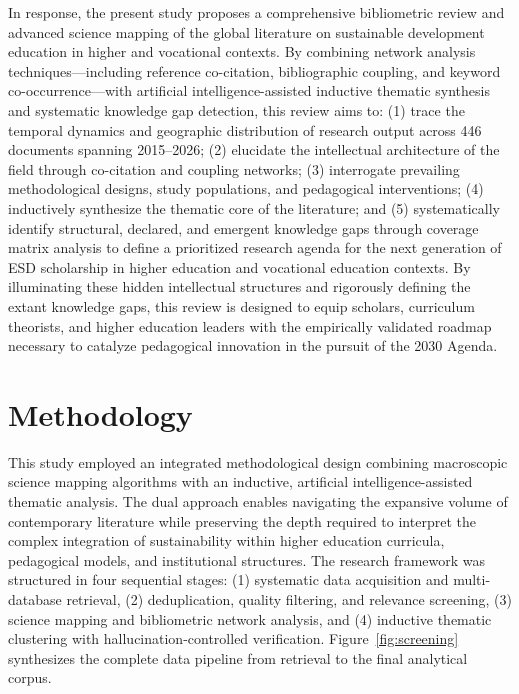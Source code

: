 \documentclass[pdflatex,sn-basic]{sn-jnl}%
\begin{document}
In response, the present study proposes a comprehensive bibliometric review and advanced science mapping of the global literature on sustainable development education in higher and vocational contexts. By combining network analysis techniques---including reference co-citation, bibliographic coupling, and keyword co-occurrence---with artificial intelligence-assisted inductive thematic synthesis and systematic knowledge gap detection, this review aims to: (1) trace the temporal dynamics and geographic distribution of research output across 446 documents spanning 2015--2026; (2) elucidate the intellectual architecture of the field through co-citation and coupling networks; (3) interrogate prevailing methodological designs, study populations, and pedagogical interventions; (4) inductively synthesize the thematic core of the literature; and (5) systematically identify structural, declared, and emergent knowledge gaps through coverage matrix analysis to define a prioritized research agenda for the next generation of ESD scholarship in higher education and vocational education contexts. By illuminating these hidden intellectual structures and rigorously defining the extant knowledge gaps, this review is designed to equip scholars, curriculum theorists, and higher education leaders with the empirically validated roadmap necessary to catalyze pedagogical innovation in the pursuit of the 2030 Agenda.


\section{Methodology}
\label{sec:metodologia}

This study employed an integrated methodological design combining macroscopic science mapping algorithms with an inductive, artificial intelligence-assisted thematic analysis. The dual approach enables navigating the expansive volume of contemporary literature while preserving the depth required to interpret the complex integration of sustainability within higher education curricula, pedagogical models, and institutional structures. The research framework was structured in four sequential stages: (1) systematic data acquisition and multi-database retrieval, (2) deduplication, quality filtering, and relevance screening, (3) science mapping and bibliometric network analysis, and (4) inductive thematic clustering with hallucination-controlled verification. Figure~\ref{fig:screening} synthesizes the complete data pipeline from retrieval to the final analytical corpus.
\end{document}
